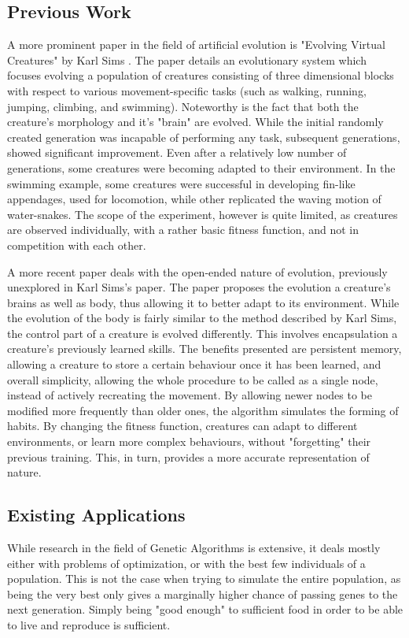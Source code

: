 \subsection{Previous Work}
A more prominent paper in the field of artificial evolution is "Evolving Virtual Creatures" by Karl Sims \cite{sims1994evolving}. The paper details an evolutionary system which focuses evolving a population of creatures consisting of three dimensional blocks with respect to various movement-specific tasks (such as walking, running, jumping, climbing, and swimming). Noteworthy is the fact that both the creature's morphology and it's "brain" are evolved. While the initial randomly created generation was incapable of performing any task, subsequent generations, showed significant improvement. Even after a relatively low number of generations, some creatures were becoming adapted to their environment. In the swimming example, some creatures were successful in developing fin-like appendages, used for locomotion, while other replicated the waving motion of water-snakes. The scope of the experiment, however is quite limited, as creatures are observed individually, with a rather basic fitness function, and not in competition with each other.

A more recent paper \cite{lessin2013open} deals with the open-ended nature of evolution, previously unexplored in Karl Sims's paper. The paper proposes the evolution a creature's brains as well as body, thus allowing it to better adapt to its environment. While the evolution of the body is fairly similar to the method described by Karl Sims, the control part of a creature is evolved differently. This involves encapsulation a creature's previously learned skills. The benefits presented are persistent memory, allowing a creature to store a certain behaviour once it has been learned, and overall simplicity, allowing the whole procedure to be called as a single node, instead of actively recreating the movement. By allowing newer nodes to be modified more frequently than older ones, the algorithm simulates the forming of habits. By changing the fitness function, creatures can adapt to different environments, or learn more complex behaviours, without "forgetting" their previous training. This, in turn, provides a more accurate representation of nature.

\subsection{Existing Applications}
While research in the field of Genetic Algorithms is extensive, it deals mostly either with problems of optimization, or with the best few individuals of a population. This is not the case when trying to simulate the entire population, as being the very best only gives a marginally higher chance of passing genes to the next generation. Simply being "good enough" to sufficient food in order to be able to live and reproduce is sufficient.

